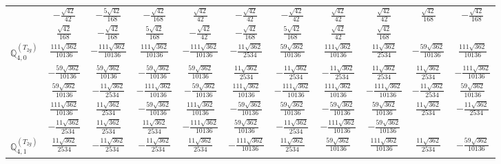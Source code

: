 \documentclass[fleqn,10pt,landscape]{article}
\begin{document}
\begin{itemize}
{\begin{center}
\begin{longtable}{ccccccccccc}
& $ - \frac{\sqrt{42}}{42} $ & $ - \frac{5 \sqrt{42}}{168} $ & $ - \frac{\sqrt{42}}{168} $ & $ \frac{\sqrt{42}}{42} $ & $ - \frac{\sqrt{42}}{42} $ & $ - \frac{\sqrt{42}}{42} $ & $ \frac{\sqrt{42}}{42} $ & $ \frac{\sqrt{42}}{42} $ & $ \frac{\sqrt{42}}{168} $ & $ - \frac{\sqrt{42}}{168} $ \\
& $ \frac{\sqrt{42}}{168} $ & $ - \frac{\sqrt{42}}{168} $ & $ \frac{5 \sqrt{42}}{168} $ & $ - \frac{\sqrt{42}}{42} $ & $ - \frac{\sqrt{42}}{168} $ & $ \frac{5 \sqrt{42}}{168} $ & $ \frac{\sqrt{42}}{42} $ & $ \frac{\sqrt{42}}{168} $ & $  $ & $  $ \\ \hline
$\mathbb{Q}_{4,0}^{(T_{2g})}$ & $ \frac{111 \sqrt{362}}{10136} $ & $ - \frac{111 \sqrt{362}}{10136} $ & $ \frac{111 \sqrt{362}}{10136} $ & $ - \frac{111 \sqrt{362}}{10136} $ & $ - \frac{11 \sqrt{362}}{2534} $ & $ \frac{59 \sqrt{362}}{10136} $ & $ \frac{111 \sqrt{362}}{10136} $ & $ \frac{11 \sqrt{362}}{2534} $ & $ - \frac{59 \sqrt{362}}{10136} $ & $ \frac{111 \sqrt{362}}{10136} $ \\
& $ - \frac{59 \sqrt{362}}{10136} $ & $ \frac{59 \sqrt{362}}{10136} $ & $ - \frac{59 \sqrt{362}}{10136} $ & $ \frac{59 \sqrt{362}}{10136} $ & $ \frac{11 \sqrt{362}}{2534} $ & $ - \frac{11 \sqrt{362}}{2534} $ & $ - \frac{11 \sqrt{362}}{2534} $ & $ \frac{11 \sqrt{362}}{2534} $ & $ \frac{11 \sqrt{362}}{2534} $ & $ - \frac{111 \sqrt{362}}{10136} $ \\
& $ \frac{59 \sqrt{362}}{10136} $ & $ - \frac{11 \sqrt{362}}{2534} $ & $ - \frac{111 \sqrt{362}}{10136} $ & $ - \frac{59 \sqrt{362}}{10136} $ & $ \frac{111 \sqrt{362}}{10136} $ & $ - \frac{111 \sqrt{362}}{10136} $ & $ \frac{111 \sqrt{362}}{10136} $ & $ - \frac{111 \sqrt{362}}{10136} $ & $ - \frac{11 \sqrt{362}}{2534} $ & $ \frac{59 \sqrt{362}}{10136} $ \\
& $ \frac{111 \sqrt{362}}{10136} $ & $ \frac{11 \sqrt{362}}{2534} $ & $ - \frac{59 \sqrt{362}}{10136} $ & $ \frac{111 \sqrt{362}}{10136} $ & $ - \frac{59 \sqrt{362}}{10136} $ & $ \frac{59 \sqrt{362}}{10136} $ & $ - \frac{59 \sqrt{362}}{10136} $ & $ \frac{59 \sqrt{362}}{10136} $ & $ \frac{11 \sqrt{362}}{2534} $ & $ - \frac{11 \sqrt{362}}{2534} $ \\
& $ - \frac{11 \sqrt{362}}{2534} $ & $ \frac{11 \sqrt{362}}{2534} $ & $ \frac{11 \sqrt{362}}{2534} $ & $ - \frac{111 \sqrt{362}}{10136} $ & $ \frac{59 \sqrt{362}}{10136} $ & $ - \frac{11 \sqrt{362}}{2534} $ & $ - \frac{111 \sqrt{362}}{10136} $ & $ - \frac{59 \sqrt{362}}{10136} $ & $  $ & $  $ \\ \hline
$\mathbb{Q}_{4,1}^{(T_{2g})}$ & $ \frac{11 \sqrt{362}}{2534} $ & $ - \frac{11 \sqrt{362}}{2534} $ & $ - \frac{11 \sqrt{362}}{2534} $ & $ \frac{11 \sqrt{362}}{2534} $ & $ - \frac{111 \sqrt{362}}{10136} $ & $ \frac{11 \sqrt{362}}{2534} $ & $ \frac{59 \sqrt{362}}{10136} $ & $ \frac{111 \sqrt{362}}{10136} $ & $ \frac{11 \sqrt{362}}{2534} $ & $ - \frac{59 \sqrt{362}}{10136} $ \\

\end{longtable}
\end{center}}
\end{itemize}
\end{document}
